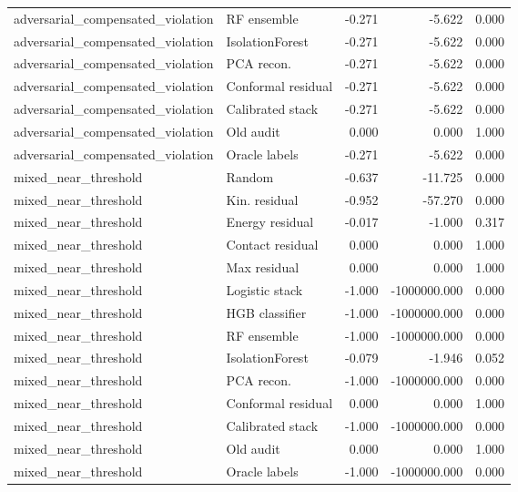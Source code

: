 {\begin{longtable}{llrrr}
adversarial\_compensated\_violation & RF ensemble & -0.271 & -5.622 & 0.000 \\
adversarial\_compensated\_violation & IsolationForest & -0.271 & -5.622 & 0.000 \\
adversarial\_compensated\_violation & PCA recon. & -0.271 & -5.622 & 0.000 \\
adversarial\_compensated\_violation & Conformal residual & -0.271 & -5.622 & 0.000 \\
adversarial\_compensated\_violation & Calibrated stack & -0.271 & -5.622 & 0.000 \\
adversarial\_compensated\_violation & Old audit & 0.000 & 0.000 & 1.000 \\
adversarial\_compensated\_violation & Oracle labels & -0.271 & -5.622 & 0.000 \\
mixed\_near\_threshold & Random & -0.637 & -11.725 & 0.000 \\
mixed\_near\_threshold & Kin. residual & -0.952 & -57.270 & 0.000 \\
mixed\_near\_threshold & Energy residual & -0.017 & -1.000 & 0.317 \\
mixed\_near\_threshold & Contact residual & 0.000 & 0.000 & 1.000 \\
mixed\_near\_threshold & Max residual & 0.000 & 0.000 & 1.000 \\
mixed\_near\_threshold & Logistic stack & -1.000 & -1000000.000 & 0.000 \\
mixed\_near\_threshold & HGB classifier & -1.000 & -1000000.000 & 0.000 \\
mixed\_near\_threshold & RF ensemble & -1.000 & -1000000.000 & 0.000 \\
mixed\_near\_threshold & IsolationForest & -0.079 & -1.946 & 0.052 \\
mixed\_near\_threshold & PCA recon. & -1.000 & -1000000.000 & 0.000 \\
mixed\_near\_threshold & Conformal residual & 0.000 & 0.000 & 1.000 \\
mixed\_near\_threshold & Calibrated stack & -1.000 & -1000000.000 & 0.000 \\
mixed\_near\_threshold & Old audit & 0.000 & 0.000 & 1.000 \\
mixed\_near\_threshold & Oracle labels & -1.000 & -1000000.000 & 0.000 \\
\bottomrule
\end{longtable}
}
